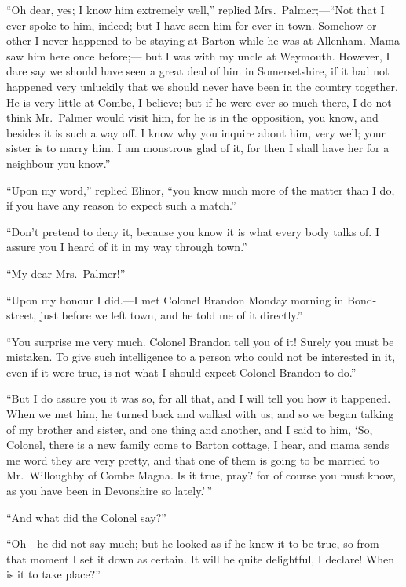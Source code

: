 \documentclass{article}
\begin{document}
``Oh dear, yes; I know him extremely well,''
replied Mrs.\ Palmer;---``Not that I ever spoke
to him, indeed; but I have seen him for ever in town.
Somehow or other I never happened to be staying at Barton
while he was at Allenham.  Mama saw him here once before;---%
but I was with my uncle at Weymouth.  However, I dare say
we should have seen a great deal of him in Somersetshire,
if it had not happened very unluckily that we should never
have been in the country together.  He is very little
at Combe, I believe; but if he were ever so much there,
I do not think Mr.\ Palmer would visit him, for he is
in the opposition, you know, and besides it is such a
way off.  I know why you inquire about him, very well;
your sister is to marry him.  I am monstrous glad of it,
for then I shall have her for a neighbour you know.''

``Upon my word,'' replied Elinor, ``you know much
more of the matter than I do, if you have any reason
to expect such a match.''

``Don't pretend to deny it, because you know it is
what every body talks of.  I assure you I heard of it
in my way through town.''

``My dear Mrs.\ Palmer!''

``Upon my honour I did.---I met Colonel Brandon
Monday morning in Bond-street, just before we left town,
and he told me of it directly.''

``You surprise me very much.  Colonel Brandon tell
you of it!  Surely you must be mistaken.  To give such
intelligence to a person who could not be interested in it,
even if it were true, is not what I should expect Colonel
Brandon to do.''

``But I do assure you it was so, for all that,
and I will tell you how it happened.  When we met him,
he turned back and walked with us; and so we began talking
of my brother and sister, and one thing and another,
and I said to him, `So, Colonel, there is a new family
come to Barton cottage, I hear, and mama sends me word
they are very pretty, and that one of them is going to be
married to Mr.\ Willoughby of Combe Magna.  Is it true,
pray? for of course you must know, as you have been in
Devonshire so lately.'\,''

``And what did the Colonel say?''

``Oh---he did not say much; but he looked as if he
knew it to be true, so from that moment I set it down
as certain.  It will be quite delightful, I declare!
When is it to take place?''
\end{document}
